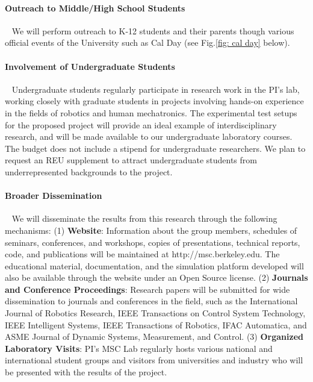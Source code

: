 \paragraph*{Outreach to Middle/High School Students}~
We will perform outreach to K-12 students and their parents though various official events of the University such as Cal Day (see Fig.\ref{fig: cal day} below). 
\paragraph*{Involvement of Undergraduate Students}~
Undergraduate students regularly participate in research work in the PI's lab, working closely with graduate students in projects involving hands-on experience in the fields of robotics and human mechatronics. The experimental test setups for the proposed project will provide an ideal example of interdisciplinary research, and will be made available to our undergraduate laboratory courses. The budget does not include a stipend for undergraduate researchers. We plan to request an REU supplement to attract undergraduate students from underrepresented backgrounds to the project.



\paragraph*{Broader Dissemination}~
We will disseminate the results from this research through the following mechanisms: 
(1) \textbf{Website}: Information about the group members, schedules of seminars, conferences, and workshops, copies of presentations, technical reports, code, and publications will be maintained at http://msc.berkeley.edu. The educational material, documentation, and the simulation platform developed will also be available through the website under an Open Source license. 
(2) \textbf{Journals and Conference Proceedings}: Research papers will be submitted for wide dissemination to journals and conferences in the field, such as the International Journal of Robotics Research, IEEE Transactions on Control System Technology, IEEE Intelligent Systems, IEEE Transactions of Robotics, IFAC Automatica, and ASME Journal of Dynamic Systems, Measurement, and Control.
(3) \textbf{Organized Laboratory Visits}: PI's MSC Lab regularly hosts various national and international student groups and visitors from universities and industry who will be presented with the results of the project.



